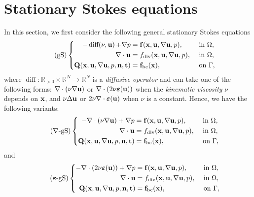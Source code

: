 \documentclass[oneside,11pt]{book}
\numberwithin{equation}{section}
\begin{document}
\section{Stationary Stokes equations}
In this section, we first consider the following general stationary Stokes equations
\begin{equation}
    \label{general stationary Stokes}
    \tag{gS}
    \left\{\begin{split}
        -\operatorname{diff(\nu,{\bf u})} + \nabla p &= {\bf f}({\bf x},{\bf u},\nabla{\bf u},p),&&\mbox{ in }\Omega,\\
        \nabla\cdot{\bf u} &= f_{\rm div}({\bf x},{\bf u},\nabla{\bf u},p),&&\mbox{ in }\Omega,\\
        {\bf Q}({\bf x},{\bf u},\nabla{\bf u},p,{\bf n},{\bf t}) &= {\bf f}_{\rm bc}({\bf x}),&&\mbox{ on }\Gamma,
    \end{split}\right.
\end{equation}
where $\operatorname{diff}:\mathbb{R}_{> 0}\times\mathbb{R}^N\to\mathbb{R}^N$ is a \textit{diffusive operator} and can take one of the following forms: $\nabla\cdot(\nu\nabla{\bf u})$ or $\nabla\cdot(2\nu\boldsymbol{\varepsilon}({\bf u}))$ when the \textit{kinematic viscosity} $\nu$ depends on ${\bf x}$, and $\nu\Delta{\bf u}$ or $2\nu\nabla\cdot\boldsymbol{\varepsilon}({\bf u})$ when $\nu$ is a constant. Hence, we have the following variants:
\begin{equation}
    \label{general stationary Stokes/gradient}
    \tag{$\nabla$-gS}
    \left\{\begin{split}
        -\nabla\cdot(\nu\nabla{\bf u}) + \nabla p &= {\bf f}({\bf x},{\bf u},\nabla{\bf u},p),&&\mbox{ in }\Omega,\\
        \nabla\cdot{\bf u} &= f_{\rm div}({\bf x},{\bf u},\nabla{\bf u},p),&&\mbox{ in }\Omega,\\
        {\bf Q}({\bf x},{\bf u},\nabla{\bf u},p,{\bf n},{\bf t}) &= {\bf f}_{\rm bc}({\bf x}),&&\mbox{ on }\Gamma,
    \end{split}\right.
\end{equation}
and
\begin{equation}
    \label{general stationary Stokes/symmetrized gradient}
    \tag{$\boldsymbol{\varepsilon}$-gS}
    \left\{\begin{split}
        -\nabla\cdot(2\nu\boldsymbol{\varepsilon}({\bf u})) + \nabla p &= {\bf f}({\bf x},{\bf u},\nabla{\bf u},p),&&\mbox{ in }\Omega,\\
        \nabla\cdot{\bf u} &= f_{\rm div}({\bf x},{\bf u},\nabla{\bf u},p),&&\mbox{ in }\Omega,\\
        {\bf Q}({\bf x},{\bf u},\nabla{\bf u},p,{\bf n},{\bf t}) &= {\bf f}_{\rm bc}({\bf x}),&&\mbox{ on }\Gamma,
    \end{split}\right.
\end{equation}
\end{document}
